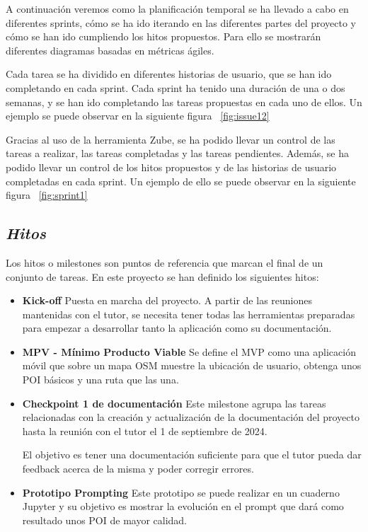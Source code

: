  A continuación veremos como la planificación temporal se ha llevado a cabo en diferentes sprints, cómo se ha ido iterando en las diferentes partes del proyecto y cómo se han ido cumpliendo los hitos propuestos. Para ello se mostrarán diferentes diagramas basadas en métricas ágiles.

 Cada tarea se ha dividido en diferentes historias de usuario, que se han ido completando en cada sprint. Cada sprint ha tenido una duración de una o dos semanas, y se han ido completando las tareas propuestas en cada uno de ellos.
 Un ejemplo se puede observar en la siguiente figura ~\ref{fig:issue12}

Gracias al uso de la herramienta Zube, se ha podido llevar un control de las tareas a realizar, las tareas completadas y las tareas pendientes. Además, se ha podido llevar un control de los hitos propuestos y de las historias de usuario completadas en cada sprint. Un ejemplo de ello se puede observar en la siguiente figura ~\ref{fig:sprint1}

\subsection{\textit{Hitos}}
Los hitos o milestones son puntos de referencia que marcan el final de un conjunto de tareas. En este proyecto se han definido los siguientes hitos:

\begin{itemize}

    \item \textbf{Kick-off} Puesta en marcha del proyecto. A partir de las reuniones mantenidas con el tutor, se necesita tener todas las herramientas preparadas para empezar a desarrollar tanto la aplicación como su documentación.
    
    \item \textbf{MPV - Mínimo Producto Viable} Se define el MVP como una aplicación móvil que sobre un mapa OSM muestre la ubicación de usuario, obtenga unos POI básicos y una ruta que las una.

    \item \textbf{Checkpoint 1 de documentación} Este milestone agrupa las tareas relacionadas con la creación y actualización de la documentación del proyecto hasta la reunión con el tutor el 1 de septiembre de 2024.

    El objetivo es tener una documentación suficiente para que el tutor pueda dar feedback acerca de la misma y poder corregir errores.

    \item \textbf{Prototipo Prompting} Este prototipo se puede realizar en un cuaderno Jupyter y su objetivo es mostrar la evolución en el prompt que dará como resultado unos POI de mayor calidad.
\end{itemize}


